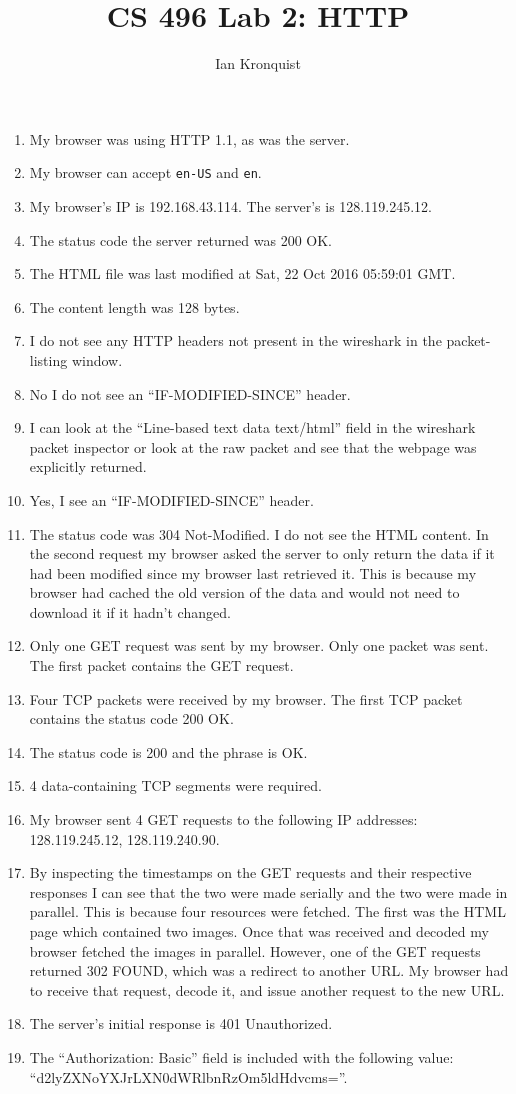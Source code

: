 \documentclass[12pt]{article}
\title{CS 496 Lab 2: HTTP}
\author{Ian Kronquist}
\begin{document}
\maketitle

\begin{enumerate}
    \item My browser was  using HTTP 1.1, as was the server.
    \item My browser can accept \texttt{en-US} and \texttt{en}.
    \item My browser's IP is 192.168.43.114. The server's is 128.119.245.12.
    \item The status code the server returned was 200 OK.
    \item The HTML file was last modified at Sat, 22 Oct 2016 05:59:01 GMT.
    \item The content length was 128 bytes.
    \item I do not see any HTTP headers not present in the wireshark in the packet-listing window.
    \item No I do not see an ``IF-MODIFIED-SINCE'' header.
    \item I can look at the ``Line-based text data text/html'' field in the wireshark packet inspector or look at the raw packet and see that the webpage was explicitly returned.
    \item Yes, I see an ``IF-MODIFIED-SINCE'' header.
    \item The status code was 304 Not-Modified. I do not see the HTML content. In the second request my browser asked the server to only return the data if it had been modified since my browser last retrieved it. This is because my browser had cached the old version of the data and would not need to download it if it hadn't changed.
    \item Only one GET request was sent by my browser. Only one packet was sent. The first packet contains the GET request.
    \item Four TCP packets were received by my browser. The first TCP packet contains the status code 200 OK.
    \item The status code is 200 and the phrase is OK.
    \item 4 data-containing TCP segments were required.
    \item My browser sent 4 GET requests to the following IP addresses: 128.119.245.12, 128.119.240.90.
    \item By inspecting the timestamps on the GET requests and their respective responses I can see that the two were made serially and the two were made in parallel. This is because four resources were fetched. The first was the HTML page which contained two images. Once that was received and decoded my browser fetched the images in parallel. However, one of the GET requests returned 302 FOUND, which was a redirect to another URL. My browser had to receive that request, decode it, and issue another request to the new URL.
    \item The server's initial response is 401 Unauthorized.
    \item The ``Authorization: Basic'' field is included with the following value: ``d2lyZXNoYXJrLXN0dWRlbnRzOm5ldHdvcms=''.



\end{enumerate}
\end{document}
